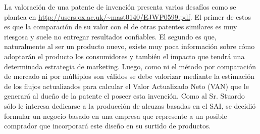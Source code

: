La valoración de una patente de invención presenta varios desafíos como se plantea en \url{http://users.ox.ac.uk/~mast0140/EJWP0599.pdf}. El primer de estos es que la comparación de su valor con el de otras patentes similares es muy riesgosa y suele no entregar resultados confiables. El segundo es que, naturalmente al ser un producto nuevo, existe muy poca información sobre cómo adoptarán el producto los consumidores y también el impacto que tendrá una determinada estrategia de marketing. Luego, como ni el método por comparación de mercado ni por múltiplos son válidos se debe valorizar mediante la estimación de los flujos actualizados para calcular el Valor Actualizado Neto (VAN) que le generará al dueño de la patente el poseer esta invención. Como al Sr. Stuardo sólo le interesa dedicarse a la producción de alcuzas basadas en el SAI, se decidió formular un negocio basado en una empresa que represente a un posible comprador que incorporará este diseño en su surtido de productos.
